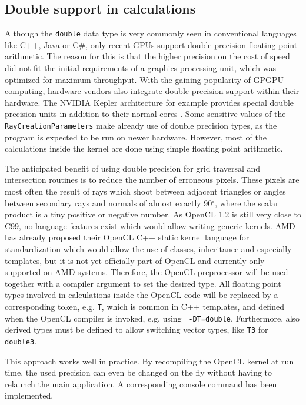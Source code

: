\subsection{Double support in calculations}

Although the \lstinline!double! data type is very commonly seen in conventional languages like C++, Java or C\#, only recent GPUs support double precision floating point arithmetic. The reason for this is that the higher precision on the cost of speed did not fit the initial requirements of a graphics processing unit, which was optimized for maximum throughput. With the gaining popularity of GPGPU computing, hardware vendors also integrate double precision support within their hardware. The NVIDIA Kepler architecture for example provides special double precision units in addition to their normal cores \cite[p.8]{kepler_arch}. Some sensitive values of the \lstinline!RayCreationParameters! make already use of double precision types, as the program is expected to be run on newer hardware. However, most of the calculations inside the kernel are done using simple floating point arithmetic.

The anticipated benefit of using double precision for grid traversal and intersection routines is to reduce the number of erroneous pixels. These pixels are most often the result of rays which shoot between adjacent triangles or angles between secondary rays and normals of almost exactly 90$^\circ$, where the scalar product is a tiny positive or negative number. As OpenCL 1.2 is still very close to C99, no language features exist which would allow writing generic kernels. AMD has already proposed their OpenCL C++ static kernel language for standardization which would allow the use of classes, inheritance and especially templates, but it is not yet officially part of OpenCL and currently only supported on AMD systems. Therefore, the OpenCL preprocessor will be used together with a compiler argument to set the desired type. All floating point types involved in calculations inside the OpenCL code will be replaced by a corresponding token, e.g. \lstinline!T!, which is common in C++ templates, and defined when the OpenCL compiler is invoked, e.g. using \lstinline! -DT=double!. Furthermore, also derived types must be defined to allow switching vector types, like \lstinline!T3! for \lstinline!double3!.

This approach works well in practice. By recompiling the OpenCL kernel at run time, the used precision can even be changed on the fly without having to relaunch the main application. A corresponding console command has been implemented.

